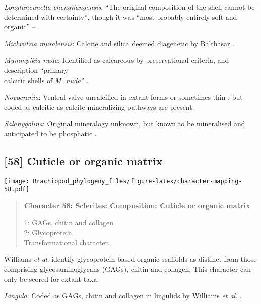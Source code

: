 \documentclass[openany]{book}
\theoremstyle{definition}
\theoremstyle{definition}
\theoremstyle{definition}
\theoremstyle{remark}
\begin{document}
\hypertarget{Longtancunella_chengjiangensis-coding-57}{}
\emph{Longtancunella chengjiangensis}: ``The original composition of the
shell cannot be determined with certainty'', though it was ``most
probably entirely soft and organic'' --
\citet{Zhang2011Theexceptionally}.

\hypertarget{Mickwitzia_muralensis-coding-57}{}
\emph{Mickwitzia muralensis}: Calcite and silica deemed diagenetic by
Balthasar \citeyearpar{Balthasar2004Shellstructure}.

\hypertarget{Mummpikia_nuda-coding-57}{}
\emph{Mummpikia nuda}: Identified as calcareous by preservational
criteria, and description ``primary\\
calcitic shells of \emph{M. nuda}'' \citep{Balthasar2008iMummpikia}.

\hypertarget{Novocrania-coding-57}{}
\emph{Novocrania}: Ventral valve uncalcified in extant forms or
sometimes thin \citep{Williams2000LinguliformeaCraniiformea}, but coded
as calcitic as calcite-mineralizing pathways are present.

\hypertarget{Salanygolina-coding-57}{}
\emph{Salanygolina}: Original mineralogy unknown, but known to be
mineralised and anticipated to be phosphatic
\citep{Holmer2009Theenigmatic}.

\subsection*{{[}58{]} Cuticle or organic
matrix}\label{cuticle-or-organic-matrix}

\texttt{[image: Brachiopod\_phylogeny\_files/figure-latex/character-mapping-58.pdf]}

\begin{quote}
\textbf{Character 58: Sclerites: Composition: Cuticle or organic matrix}

1: GAGs, chitin and collagen\\
2: Glycoprotein\\
Transformational character.
\end{quote}

Williams \emph{et al}. \citeyearpar{Williams1996Asupra} identify
glycoprotein-based organic scaffolds as distinct from those comprising
glycosaminoglycans (GAGs), chitin and collagen. This character can only
be scored for extant taxa.

\hypertarget{Lingula-coding-58}{}
\emph{Lingula}: Coded as GAGs, chitin and collagen in lingulids by
Williams \emph{et al}. \citeyearpar{Williams1996Asupra}.
\end{document}
